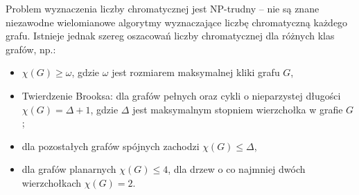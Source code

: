 Problem wyznaczenia liczby chromatycznej jest NP-trudny
– nie są znane niezawodne wielomianowe algorytmy wyznaczające liczbę chromatyczną każdego grafu.
Istnieje jednak szereg oszacowań liczby chromatycznej dla różnych klas grafów, np.:

\begin{itemize}
    \item $\chi (G)\geqslant \omega$, gdzie $\omega$  jest rozmiarem maksymalnej kliki grafu $G$,
    \item Twierdzenie Brooksa: dla grafów pełnych oraz cykli o nieparzystej długości $\chi (G)=\Delta +1$,
    gdzie $\Delta$  jest maksymalnym stopniem wierzchołka w grafie $G$;
    \item dla pozostałych grafów spójnych zachodzi $ \chi (G)\leqslant \Delta$,
    \item dla grafów planarnych  $\chi (G)\leqslant 4$, dla drzew o co najmniej dwóch wierzchołkach $\chi (G)=2$.
\end{itemize}
